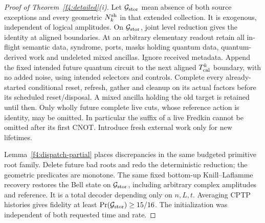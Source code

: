 \begin{proof}[Proof of Theorem~\ref{f4:detailed}(i)]
Let \(\mathcal G_{\rm stor}\) mean absence of both source exceptions and every geometric
\(N^{\rm sh}_k\) in that extended collection. It is exogenous, independent of
logical amplitudes. On \(\mathcal G_{\rm stor}\), joint level reduction gives the identity
at aligned boundaries. At an arbitrary elementary readout retain all
in-flight semantic data, syndrome, ports, masks holding quantum
data, quantum-derived work and undeleted mixed ancillas. Ignore received
metadata. Append the fixed intended future quantum circuit to the
next aligned \(T_{\rm cal}^k\) boundary, with no added noise, using intended
selectors and controls. Complete every already-started conditional reset,
refresh, gather and cleanup on its actual factors before its scheduled
reset/disposal. A mixed ancilla holding the old target is retained until then.
Only wholly future complete live cuts, whose reference action is
identity, may be omitted. In particular the suffix of a live Fredkin
cannot be omitted after its first CNOT. Introduce fresh external work
only for new lifetimes.

Lemma~\ref{f4:dispatch-partial} places discrepancies in the same
budgeted primitive root family. Delete future bad roots and redo the
deterministic reduction; the geometric predicates are monotone.
The same fixed bottom-up Knill--Laflamme recovery restores the Bell
state on \(\mathcal G_{\rm stor}\), including arbitrary complex amplitudes and reference.
It is a total decoder depending only on \(n,L,t\). Averaging CPTP
histories gives fidelity at least \(\Pr(\mathcal G_{\rm stor})\ge15/16\).
The initialization was independent of both requested time and rate.
\end{proof}
